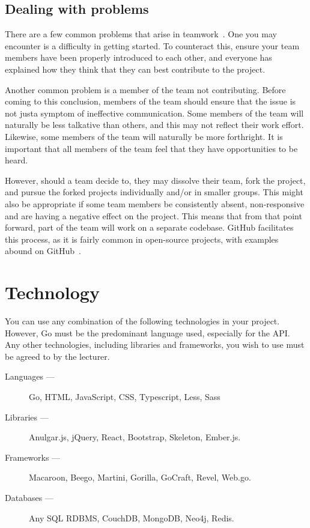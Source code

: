 \subsection*{Dealing with problems}
There are a few common problems that arise in teamwork~\cite{teamworkproblems}.
One you may encounter is a difficulty in getting started.
To counteract this, ensure your team members have been properly introduced to each other, and everyone has explained how they think that they can best contribute to the project.

Another common problem is a member of the team not contributing.
Before coming to this conclusion, members of the team should ensure that the issue is not justa symptom of ineffective communication.
Some members of the team will naturally be less talkative than others, and this may not reflect their work effort.
Likewise, some members of the team will naturally be more forthright.
It is important that all members of the team feel that they have opportunities to be heard.

However, should a team decide to, they may dissolve their team, fork the project, and pursue the forked projects individually and/or in smaller groups.
This might also be appropriate if some team members be consistently absent, non-responsive and are having a negative effect on the project.
This means that from that point forward, part of the team will work on a separate codebase.
GitHub facilitates this process, as it is fairly common in open-source projects, with examples abound on GitHub~\cite{githubforking}.

\section*{Technology}
You can use any combination of the following technologies in your project.
However, Go must be the predominant language used, especially for the API.
Any other technologies, including libraries and frameworks, you wish to use must be agreed to by the lecturer.

\begin{description}
\item[Languages ---] Go, HTML, JavaScript, CSS, Typescript, Less, Sass
\item[Libraries ---] Anulgar.js, jQuery, React, Bootstrap, Skeleton, Ember.js.
\item[Frameworks ---] Macaroon, Beego, Martini, Gorilla, GoCraft, Revel, Web.go.
\item[Databases ---] Any SQL RDBMS, CouchDB, MongoDB, Neo4j, Redis.
\end{description}

